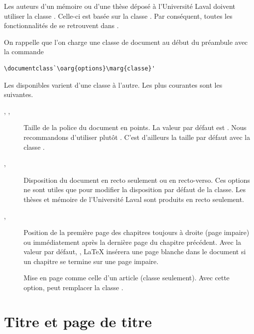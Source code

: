 Les auteurs d'un mémoire ou d'une thèse déposé à l'Université Laval
doivent utiliser la classe  \citep{ulthese}. Celle-ci
est basée sur la classe . Par conséquent, toutes les
fonctionnalités de  se retrouvent dans .

On rappelle que l'on charge une classe de document au début du
préambule avec la commande
\begin{lstlisting}
\documentclass`\oarg{options}\marg{classe}'
\end{lstlisting}
Les  disponibles varient d'une classe à l'autre. Les
plus courantes sont les suivantes.
\begin{description}
\item[\mdseries \code{10pt}, \code{11pt}, \code{12pt}] Taille de la
  police du document en points. La valeur par défaut est \code{10pt}.
  Nous recommandons d'utiliser plutôt \code{11pt}. C'est d'ailleurs la
  taille par défaut avec la classe .
\item[\mdseries {}, ] Disposition du
  document en recto seulement ou en recto-verso. Ces options ne sont
  utiles que pour modifier la disposition par défaut de la classe. Les
  thèses et mémoire de l'Université Laval sont produits en recto
  seulement.
\item[\mdseries {}, ] Position de la
  première page des chapitres toujours à droite (page impaire) ou
  immédiatement après la dernière page du chapitre précédent. Avec la
  valeur par défaut, , {\LaTeX} insérera une page
  blanche dans le document si un chapitre se termine sur une page
  impaire.
\item[\mdseries {}] Mise en page comme celle d'un article
  (classe  seulement). Avec cette option, 
  peut remplacer la classe .
\end{description}


\section{Titre et page de titre}

